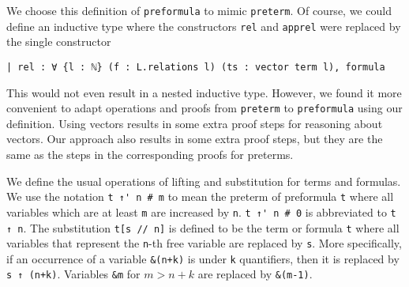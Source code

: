 \documentclass[a4paper,USenglish,cleveref, autoref]{lipics-v2019}
\newcommand{\lil}{\lstinline}
\theoremstyle{theorem}
\theoremstyle{definition}
\begin{document}
We choose this definition of \lil{preformula} to mimic \lil{preterm}.
Of course, we could define an inductive type where the constructors \lil{rel} and \lil{apprel} were replaced by the single constructor
\begin{lstlisting}
| rel : ∀ {l : ℕ} (f : L.relations l) (ts : vector term l), formula
\end{lstlisting}
This would not even result in a nested inductive type.
However, we found it more convenient to adapt operations and proofs from \lil{preterm} to \lil{preformula} using our definition.
Using vectors results in some extra proof steps for reasoning about vectors.
Our approach also results in some extra proof steps, but they are the same as the steps in the corresponding proofs for preterms.

We define the usual operations of lifting and substitution for terms and formulas.
We use the notation \lil{t ↑' n # m} to mean the preterm of preformula \lil{t} where all variables which are at least \lil{m} are increased by \lil{n}.
\lil{t ↑' n # 0} is abbreviated to \lil{t ↑ n}.
The substitution \lil{t[s // n]} is defined to be the term or formula \lil{t} where all variables that represent the \lil{n}-th free variable are replaced by \lil{s}.
More specifically, if an occurrence of a variable \lil{&(n+k)} is under \lil{k} quantifiers, then it is replaced by \lil{s ↑ (n+k)}.
Variables \lil{&m} for $m>n+k$ are replaced by \lil{&(m-1)}.
\end{document}

